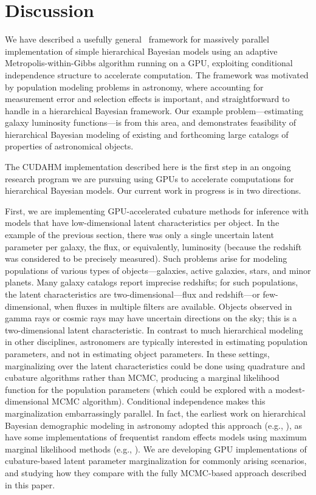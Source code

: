 \section{Discussion}
\label{sec:discussion}

We have described a usefully general \Cpp\ framework for massively parallel implementation of simple hierarchical Bayesian models using an adaptive Metropolis-within-Gibbs algorithm running on a GPU, exploiting conditional independence structure to accelerate computation.
The framework was motivated by population modeling problems in astronomy, where accounting for measurement error and selection effects is important, and straightforward to handle in a hierarchical Bayesian framework.
Our example problem---estimating galaxy luminosity functions---is from this area, and demonstrates feasibility of hierarchical Bayesian modeling of existing and forthcoming large catalogs of properties of astronomical objects.

The CUDAHM implementation described here is the first step in an ongoing research program we are pursuing using GPUs to accelerate computations for hierarchical Bayesian models.
Our current work in progress is in two directions.

First, we are implementing GPU-accelerated cubature methods for inference with models that have low-dimensional latent characteristics per object.
In the example of the previous section, there was only a single uncertain latent parameter per galaxy, the flux, or equivalently, luminosity (because the redshift was considered to be precisely measured).
Such problems arise for modeling populations of various types of objects---galaxies, active galaxies, stars, and minor planets.
Many galaxy catalogs report imprecise redshifts; for such populations, the latent characteristics are two-dimensional---flux and redshift---or few-dimensional, when fluxes in multiple filters are available.
Objects observed in gamma rays or cosmic rays may have uncertain directions on the sky; this is a two-dimensional latent characteristic.
In contrast to much hierarchical modeling in other disciplines, astronomers are typically interested in estimating population parameters, and not in estimating object parameters.
In these settings, marginalizing over the latent characteristics could be done using quadrature and cubature algorithms rather than MCMC, producing a marginal likelihood function for the population parameters (which could be explored with a modest-dimensional MCMC algorithm).
Conditional independence makes this marginalization embarrassingly parallel.
In fact, the earliest work on hierarchical Bayesian demographic modeling in astronomy adopted this approach (e.g., \cite{LW98-GRBs-Iso,LW98-GRBs-Aniso}), as have some implementations of frequentist random effects models using maximum marginal likelihood methods (e.g., \cite{WT06-IRT-MaxMargLike}).
We are developing GPU implementations of cubature-based latent parameter marginalization for commonly arising scenarios, and studying how they compare with the fully MCMC-based approach described in this paper.

